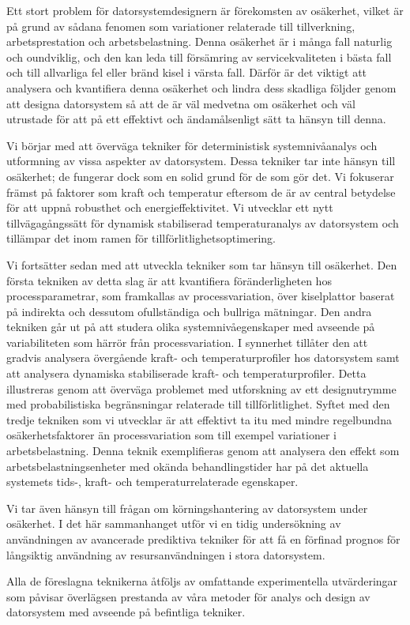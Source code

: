 Ett stort problem för datorsystemdesignern är förekomsten av osäkerhet, vilket
är på grund av sådana fenomen som variationer relaterade till tillverkning,
arbetsprestation och arbetsbelastning. Denna osäkerhet är i många fall naturlig
och oundviklig, och den kan leda till försämring av servicekvaliteten i bästa
fall och till allvarliga fel eller bränd kisel i värsta fall. Därför är det
viktigt att analysera och kvantifiera denna osäkerhet och lindra dess skadliga
följder genom att designa datorsystem så att de är väl medvetna om osäkerhet och
väl utrustade för att på ett effektivt och ändamålsenligt sätt ta hänsyn till
denna.

Vi börjar med att överväga tekniker för deterministisk systemnivåanalys och
utformning av vissa aspekter av datorsystem. Dessa tekniker tar inte hänsyn till
osäkerhet; de fungerar dock som en solid grund för de som gör det. Vi fokuserar
främst på faktorer som kraft och temperatur eftersom de är av central betydelse
för att uppnå robusthet och energieffektivitet. Vi utvecklar ett nytt
tillvägagångssätt för dynamisk stabiliserad temperaturanalys av datorsystem och
tillämpar det inom ramen för tillförlitlighetsoptimering.

Vi fortsätter sedan med att utveckla tekniker som tar hänsyn till osäkerhet. Den
första tekniken av detta slag är att kvantifiera föränderligheten hos
processparametrar, som framkallas av processvariation, över kiselplattor baserat
på indirekta och dessutom ofullständiga och bullriga mätningar. Den andra
tekniken går ut på att studera olika systemnivåegenskaper med avseende på
variabiliteten som härrör från processvariation. I synnerhet tillåter den att
gradvis analysera övergående kraft- och temperaturprofiler hos datorsystem samt
att analysera dynamiska stabiliserade kraft- och temperaturprofiler. Detta
illustreras genom att överväga problemet med utforskning av ett designutrymme
med probabilistiska begränsningar relaterade till tillförlitlighet. Syftet med
den tredje tekniken som vi utvecklar är att effektivt ta itu med mindre
regelbundna osäkerhetsfaktorer än processvariation som till exempel variationer
i arbetsbelastning. Denna teknik exemplifieras genom att analysera den effekt
som arbetsbelastningsenheter med okända behandlingstider har på det aktuella
systemets tids-, kraft- och temperaturrelaterade egenskaper.

Vi tar även hänsyn till frågan om körningshantering av datorsystem under
osäkerhet. I det här sammanhanget utför vi en tidig undersökning av användningen
av avancerade prediktiva tekniker för att få en förfinad prognos för långsiktig
användning av resursanvändningen i stora datorsystem.

Alla de föreslagna teknikerna åtföljs av omfattande experimentella utvärderingar
som påvisar överlägsen prestanda av våra metoder för analys och design av
datorsystem med avseende på befintliga tekniker.

